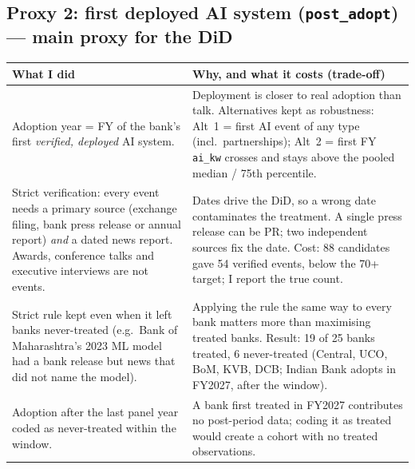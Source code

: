 \documentclass[10.5pt,a4paper]{article}
\newcommand{\var}[1]{\texttt{#1}}
\newenvironment{decisions}{%
  \begin{longtable}{L{0.36\textwidth} L{0.58\textwidth}}
  \toprule
  \textcolor{head}{\textbf{What I did}} & \textcolor{head}{\textbf{Why, and what it costs (trade-off)}}\\
  \midrule\endhead}{%
  \end{longtable}}
\newcommand{\row}[2]{#1 & #2\\ \midrule}
\begin{document}
\subsection*{Proxy 2: first deployed AI system (\var{post\_adopt}) --- main proxy for the DiD}
\begin{decisions}
\row{Adoption year = FY of the bank's first \emph{verified, deployed} AI system.}
{Deployment is closer to real adoption than talk. Alternatives kept as robustness: Alt~1 = first AI event of any type
(incl.\ partnerships); Alt~2 = first FY \var{ai\_kw} crosses and stays above the pooled median / 75th percentile.}
\row{Strict verification: every event needs a primary source (exchange filing, bank press release or annual report)
\emph{and} a dated news report. Awards, conference talks and executive interviews are not events.}
{Dates drive the DiD, so a wrong date contaminates the treatment. A single press release can be PR; two independent
sources fix the date. Cost: 88 candidates gave 54 verified events, below the 70+ target; I report the true count.}
\row{Strict rule kept even when it left banks never-treated (e.g.\ Bank of Maharashtra's 2023 ML model had a bank
release but news that did not name the model).}
{Applying the rule the same way to every bank matters more than maximising treated banks. Result: 19 of 25 banks
treated, 6 never-treated (Central, UCO, BoM, KVB, DCB; Indian Bank adopts in FY2027, after the window).}
\row{Adoption after the last panel year coded as never-treated within the window.}
{A bank first treated in FY2027 contributes no post-period data; coding it as treated would create a cohort with no
treated observations.}
\end{decisions}
\end{document}
